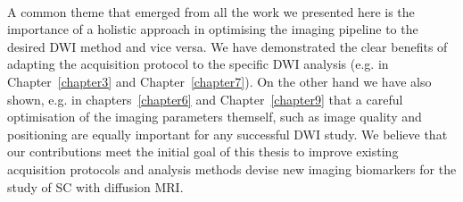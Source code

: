 \paragraph{}
A common theme that emerged from all the work we presented here is the importance of a holistic approach in optimising the imaging pipeline to the desired \gls{DWI} method and vice versa. We have demonstrated the clear benefits of adapting the acquisition protocol to the specific \gls{DWI} analysis (e.g. in Chapter~\ref{chapter3} and Chapter~\ref{chapter7}). On the other hand we have also shown, e.g. in chapters~\ref{chapter6} and Chapter~\ref{chapter9} that a careful optimisation of the imaging parameters themself, such as image quality and positioning are equally important for any successful \gls{DWI} study. We believe that our contributions meet the initial goal of this thesis to improve existing acquisition protocols and analysis methods devise new imaging biomarkers for the study of \gls{SC} with diffusion MRI.
% 

